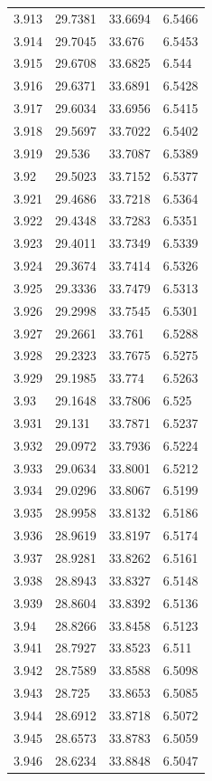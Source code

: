 \begin{tabular}{llll}
3.913 & 29.7381 & 33.6694 & 6.5466 \\
3.914 & 29.7045 & 33.676 & 6.5453 \\
3.915 & 29.6708 & 33.6825 & 6.544 \\
3.916 & 29.6371 & 33.6891 & 6.5428 \\
3.917 & 29.6034 & 33.6956 & 6.5415 \\
3.918 & 29.5697 & 33.7022 & 6.5402 \\
3.919 & 29.536 & 33.7087 & 6.5389 \\
3.92 & 29.5023 & 33.7152 & 6.5377 \\
3.921 & 29.4686 & 33.7218 & 6.5364 \\
3.922 & 29.4348 & 33.7283 & 6.5351 \\
3.923 & 29.4011 & 33.7349 & 6.5339 \\
3.924 & 29.3674 & 33.7414 & 6.5326 \\
3.925 & 29.3336 & 33.7479 & 6.5313 \\
3.926 & 29.2998 & 33.7545 & 6.5301 \\
3.927 & 29.2661 & 33.761 & 6.5288 \\
3.928 & 29.2323 & 33.7675 & 6.5275 \\
3.929 & 29.1985 & 33.774 & 6.5263 \\
3.93 & 29.1648 & 33.7806 & 6.525 \\
3.931 & 29.131 & 33.7871 & 6.5237 \\
3.932 & 29.0972 & 33.7936 & 6.5224 \\
3.933 & 29.0634 & 33.8001 & 6.5212 \\
3.934 & 29.0296 & 33.8067 & 6.5199 \\
3.935 & 28.9958 & 33.8132 & 6.5186 \\
3.936 & 28.9619 & 33.8197 & 6.5174 \\
3.937 & 28.9281 & 33.8262 & 6.5161 \\
3.938 & 28.8943 & 33.8327 & 6.5148 \\
3.939 & 28.8604 & 33.8392 & 6.5136 \\
3.94 & 28.8266 & 33.8458 & 6.5123 \\
3.941 & 28.7927 & 33.8523 & 6.511 \\
3.942 & 28.7589 & 33.8588 & 6.5098 \\
3.943 & 28.725 & 33.8653 & 6.5085 \\
3.944 & 28.6912 & 33.8718 & 6.5072 \\
3.945 & 28.6573 & 33.8783 & 6.5059 \\
3.946 & 28.6234 & 33.8848 & 6.5047 \\

\end{tabular}

